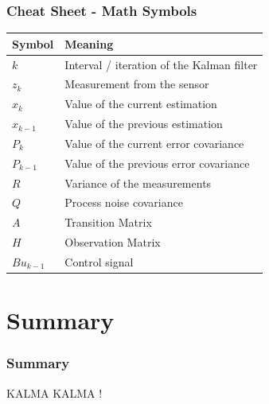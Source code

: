 \documentclass{beamer}
\begin{document}
\begin{frame}
    \frametitle{Cheat Sheet - Math Symbols}
    \begin{table}[h]
        \centering
        \begin{tabular}{|l|p{8cm}|}
        \hline
        \textbf{Symbol} & \textbf{Meaning} \\ \hline
        \(k\)          & Interval / iteration of the Kalman filter\\ \hline
        \(z_k\)       & Measurement from the sensor  \\ \hline
        \(x_k\)       & Value of the current estimation \\ \hline
        \(x_{k-1}\)   & Value of the previous estimation \\ \hline
        \(P_k\)       & Value of the current error covariance \\ \hline
        \(P_{k-1}\)   & Value of the previous error covariance \\ \hline
        \(R\)          & Variance of the measurements \\ \hline
        \(Q\)          & Process noise covariance \\ \hline
        \(A\)          & Transition Matrix \\ \hline
        \(H\)          & Observation Matrix \\ \hline
        \(Bu_{k-1}\) & Control signal \\ \hline
        \end{tabular}
        \end{table}
\end{frame}

\section{Summary}

\begin{frame}
    \frametitle{Summary}
    KALMA KALMA !
\end{frame}
\end{document}
